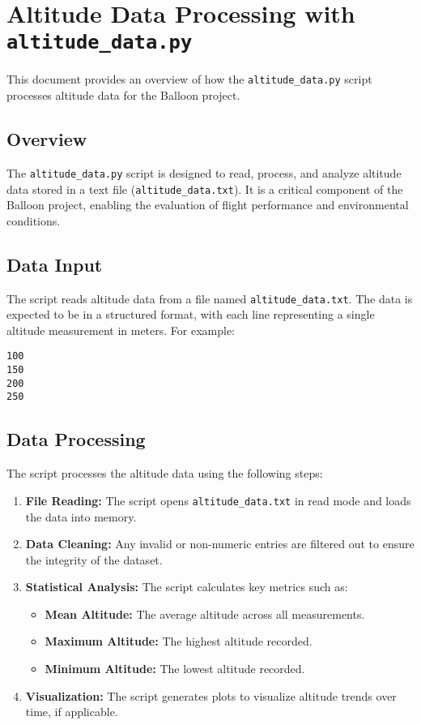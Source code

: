 \documentclass{article}
\begin{document}
\section{Altitude Data Processing with \texttt{altitude\_data.py}}
This document provides an overview of how the \texttt{altitude\_data.py} script processes altitude data for the Balloon project.

\subsection{Overview}
The \texttt{altitude\_data.py} script is designed to read, process, and analyze altitude data stored in a text file (\texttt{altitude\_data.txt}). It is a critical component of the Balloon project, enabling the evaluation of flight performance and environmental conditions.

\subsection{Data Input}
The script reads altitude data from a file named \texttt{altitude\_data.txt}. The data is expected to be in a structured format, with each line representing a single altitude measurement in meters. For example:
\begin{verbatim}
100
150
200
250
\end{verbatim}

\subsection{Data Processing}
The script processes the altitude data using the following steps:
\begin{enumerate}
    \item \textbf{File Reading:} The script opens \texttt{altitude\_data.txt} in read mode and loads the data into memory.
    \item \textbf{Data Cleaning:} Any invalid or non-numeric entries are filtered out to ensure the integrity of the dataset.
    \item \textbf{Statistical Analysis:} The script calculates key metrics such as:
    \begin{itemize}
        \item \textbf{Mean Altitude:} The average altitude across all measurements.
        \item \textbf{Maximum Altitude:} The highest altitude recorded.
        \item \textbf{Minimum Altitude:} The lowest altitude recorded.
    \end{itemize}
    \item \textbf{Visualization:} The script generates plots to visualize altitude trends over time, if applicable.
\end{enumerate}
\end{document}
